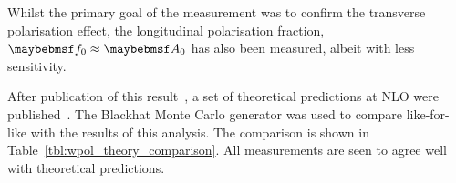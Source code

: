 Whilst the primary goal of the measurement was to confirm the transverse
polarisation effect, the longitudinal polarisation fraction, $\f0 \approx
\Azero$ has also been measured, albeit with less sensitivity.

After publication of this result~\cite{cms_wpol_paper}, a set of theoretical
predictions at \ac{NLO} were published~\cite{berger_left_handed_w}. The Blackhat
Monte Carlo generator was used to compare like-for-like with the results of this
analysis. The comparison is shown in Table~\ref{tbl:wpol_theory_comparison}. All
measurements are seen to agree well with theoretical predictions.

